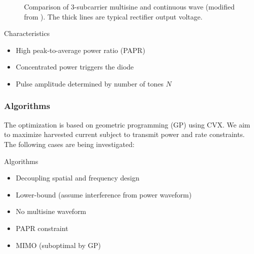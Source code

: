 \documentclass{beamer}
\begin{document}
\begin{frame}
\begin{figure}
  \caption{Comparison of 3-subcarrier multisine and continuous wave (modified from \cite{Trotter2009}). The thick lines are typical rectifier output voltage.}
  \label{fig:waveform_comparison}
\end{figure}

\begin{block}{Characteristics}
\begin{itemize}
  \item High peak-to-average power ratio (PAPR)
  \item Concentrated power triggers the diode
  \item Pulse amplitude determined by number of tones $N$
\end{itemize}
\end{block}

\end{frame}


\begin{frame}
\frametitle{Algorithms}

The optimization is based on geometric programming (GP) using CVX. We aim to maximize harvested current subject to transmit power and rate constraints. The following cases are being investigated:

\begin{block}{Algorithms}
\begin{itemize}
  \item Decoupling spatial and frequency design
  \item Lower-bound (assume interference from power waveform)
  \item No multisine waveform
  \item PAPR constraint
  \item MIMO (suboptimal by GP)
\end{itemize}
\end{block}

\end{frame}
\end{document}
